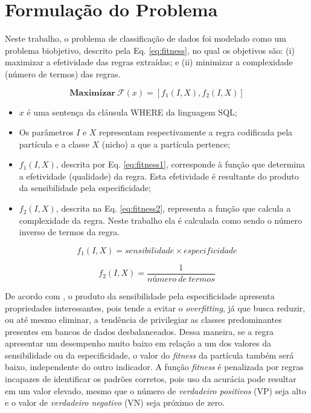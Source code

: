 \documentclass[
	12pt,				%
	openany,			%
	oneside,	
	a4paper,			%
	brazil,				%
	]{unimontes-ppgmsc-abntex2}
\begin{document}
\section{Formulação do Problema}
\label{sec:form_problema}

Neste trabalho, o problema de classificação de dados foi modelado como um problema  biobjetivo, descrito pela Eq. \ref{eq:fitness}, no qual os objetivos são: (i) maximizar a efetividade das regras extraídas; e (ii) minimizar a complexidade (número de termos) das regras. 

\begin{equation}
\label{eq:fitness}
\textbf{Maximizar}\ \mathcal{F}(x) = [f_1(I,X), f_2(I,X)]
\end{equation}

\begin{itemize}
   \item $x$ é uma sentença da cláusula WHERE da linguagem SQL;
   \item Os parâmetros $I$ e $X$ representam respectivamente a regra codificada pela partícula e a classe $X$ (nicho) a que a partícula pertence;
   \item $f_1(I,X)$, descrita por Eq. \ref{eq:fitness1}, corresponde à função que determina a efetividade (qualidade) da regra. Esta efetividade é resultante do produto da sensibilidade pela especificidade; 
   \item $f_2(I,X)$, descrita na Eq. \ref{eq:fitness2}, representa a função que calcula a complexidade da regra. Neste trabalho ela é calculada como sendo o número inverso de termos da regra.
\end{itemize}

\begin{equation}
\label{eq:fitness1}
f_1(I,X) = sensibilidade \times especificidade
\end{equation}

\begin{equation}
\label{eq:fitness2}
f_2(I,X) = \frac{1}{número\ de\ termos}
\end{equation}

De acordo com , o produto da sensibilidade pela especificidade apresenta propriedades interessantes, pois tende a evitar o {\em overfitting}, já que busca reduzir, ou até mesmo eliminar, a tendência de privilegiar as classes predominantes presentes em bancos de dados desbalanceados. Dessa maneira, se a regra apresentar um desempenho muito baixo em relação a um dos valores da sensibilidade ou da especificidade, o valor do {\em fitness} da partícula também será baixo, independente do outro indicador. A função {\em fitness} é penalizada por regras incapazes de identificar os padrões corretos, pois uso da acurácia pode resultar em um valor elevado, mesmo que o número de {\em verdadeiro positivos} (VP) seja alto e o valor de {\em verdadeiro negativo} (VN) seja próximo de zero. 
\end{document}
